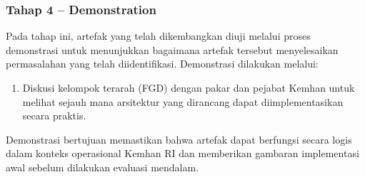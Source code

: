 \subsubsection{Tahap 4 – Demonstration}
Pada tahap ini, artefak yang telah dikembangkan diuji melalui proses demonstrasi untuk menunjukkan bagaimana artefak tersebut menyelesaikan permasalahan yang telah diidentifikasi. Demonstrasi dilakukan melalui:
\begin{enumerate}
  \item Diskusi kelompok terarah (FGD) dengan pakar dan pejabat Kemhan untuk melihat sejauh mana arsitektur yang dirancang dapat diimplementasikan secara praktis.
\end{enumerate}
Demonstrasi bertujuan memastikan bahwa artefak dapat berfungsi secara logis dalam konteks operasional Kemhan RI dan memberikan gambaran implementasi awal sebelum dilakukan evaluasi mendalam.

